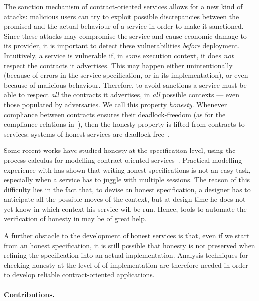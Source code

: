 The sanction mechanism of contract-oriented services
allows for a new kind of attacks: 
malicious users can try to exploit possible discrepancies between
the promised and the actual behaviour of a service
in order to make it sanctioned. %
Since these attacks may compromise the service and cause economic damage to its provider,
it is important to detect these vulnerabilities \emph{before} deployment. %
Intuitively, a service is vulnerable if, 
in \emph{some} execution context,
it does \emph{not} respect the contracts it advertises.
This may happen either unintentionally
(because of errors in the service specification, or in its implementation),
or even because of malicious behaviour.
Therefore, to avoid sanctions a service must be able
to respect \emph{all} the contracts it advertises, in \emph{all} possible contexts
--- even those populated by adversaries.
We call this property \emph{honesty}.
Whenever compliance between contracts ensures their deadlock-freedom 
(as for the compliance relations in~\cite{Acciai10coordination,Barbanera10ppdp,BSZ14concur,Laneve07concur,Rensink07infoco}),
then the honesty property is lifted from contracts to services:
systems of honest services are deadlock-free~\cite{BZ15wsfm}.

Some recent works have studied honesty at the specification level, 
using the process calculus \coco for modelling contract-oriented services~\cite{BMSZ15jlamp,BTZ12sacs,BZ15wsfm}.
Practical modelling experience with \coco has shown that writing honest specifications
is not an easy task, especially when a service has to juggle with multiple sessions.
The reason of this difficulty lies in the fact that,
to devise an honest specification, 
a designer has to anticipate all the possible moves of the context,
but at design time he does not yet know in which context his service will be run.
%
Hence, tools to automate the verification of honesty in \coco 
may be of great help.

A further obstacle to the development of honest services is that, 
even if we start from an honest \coco specification, 
it is still possible that honesty is not preserved
when refining the specification into an actual implementation.
%
Analysis techniques for checking honesty at the level of of implementation
are therefore needed in order to develop reliable contract-oriented applications.

\paragraph{Contributions.}

